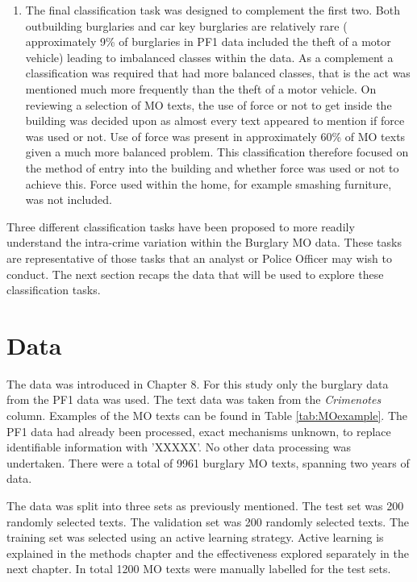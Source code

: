 \begin{enumerate}
 \item The final classification task was designed to complement the first two. Both outbuilding burglaries and car key burglaries are relatively rare ( approximately 9\% of burglaries in PF1 data included the theft of a motor vehicle) leading to imbalanced classes within the data. As a complement a classification was required that had more balanced classes, that is the act was mentioned much more frequently than the theft of a motor vehicle. On reviewing a selection of MO texts, the use of force or not to get inside the building was decided upon as almost every text appeared to mention if force was used or not. Use of force was present in approximately 60\% of MO texts given a much more balanced problem. This classification therefore focused on the method of entry into the building and whether force was used or not to achieve this. Force used within the home, for example smashing furniture, was not included.

\end{enumerate}


Three different classification tasks have been proposed to more readily understand the intra-crime variation within the Burglary MO data. These tasks are representative of those tasks that an analyst or Police Officer may wish to conduct. The next section recaps the data that will be used to explore these classification tasks. 


\section{Data} The data was introduced in Chapter 8. For this study only the burglary data from the PF1 data was used. The text data was taken from the \emph{Crimenotes} column. Examples of the MO texts can be found in Table \ref{tab:MOexample}. The PF1 data had already been processed, exact mechanisms unknown, to replace identifiable information with 'XXXXX'. No other data processing was undertaken. There were a total of 9961 burglary MO texts, spanning two years of data.

The data was split into three sets as previously mentioned. The test set was 200 randomly selected texts. The validation set was 200 randomly selected texts. The training set was selected using an active learning strategy. Active learning is explained in the methods chapter and the effectiveness explored separately in the next chapter. In total 1200 MO texts were manually labelled for the test sets. 

